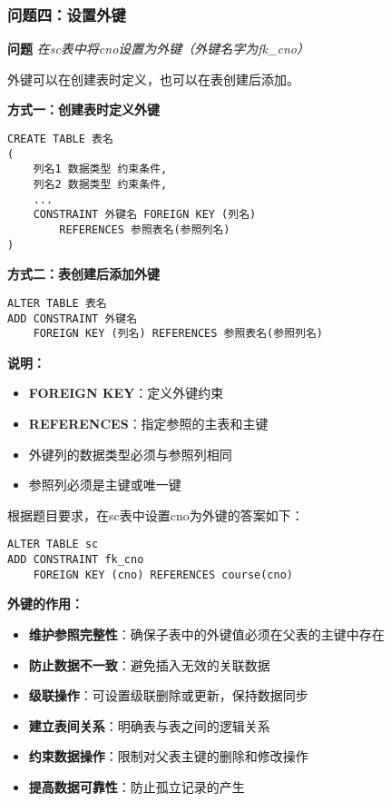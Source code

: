 \subsubsection{问题四：设置外键}

\textbf{问题} \emph{在sc表中将cno设置为外键（外键名字为fk\_cno）}

\qquad 外键可以在创建表时定义，也可以在表创建后添加。

\textbf{方式一：创建表时定义外键}

\begin{mdframed}[backgroundcolor=gray!10]
\begin{verbatim}
CREATE TABLE 表名
(
    列名1 数据类型 约束条件,
    列名2 数据类型 约束条件,
    ...
    CONSTRAINT 外键名 FOREIGN KEY (列名)
        REFERENCES 参照表名(参照列名)
)
\end{verbatim}
\end{mdframed}

\textbf{方式二：表创建后添加外键}

\begin{mdframed}[backgroundcolor=gray!10]
\begin{verbatim}
ALTER TABLE 表名
ADD CONSTRAINT 外键名
    FOREIGN KEY (列名) REFERENCES 参照表名(参照列名)
\end{verbatim}
\end{mdframed}

\textbf{说明：}
\begin{itemize}
  \item \textbf{FOREIGN KEY}：定义外键约束
  \item \textbf{REFERENCES}：指定参照的主表和主键
  \item 外键列的数据类型必须与参照列相同
  \item 参照列必须是主键或唯一键
\end{itemize}

\qquad 根据题目要求，在sc表中设置cno为外键的答案如下：

\begin{mdframed}[backgroundcolor=blue!5]
\begin{verbatim}
ALTER TABLE sc
ADD CONSTRAINT fk_cno
    FOREIGN KEY (cno) REFERENCES course(cno)
\end{verbatim}
\end{mdframed}

\begin{mdframed}[backgroundcolor=yellow!10]
  \textbf{外键的作用：}
  \begin{itemize}
    \item \textbf{维护参照完整性}：确保子表中的外键值必须在父表的主键中存在
    \item \textbf{防止数据不一致}：避免插入无效的关联数据
    \item \textbf{级联操作}：可设置级联删除或更新，保持数据同步
    \item \textbf{建立表间关系}：明确表与表之间的逻辑关系
    \item \textbf{约束数据操作}：限制对父表主键的删除和修改操作
    \item \textbf{提高数据可靠性}：防止孤立记录的产生
  \end{itemize}
\end{mdframed}

